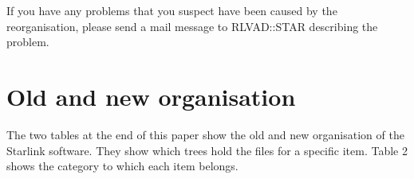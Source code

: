 If you have any problems that you suspect have been caused by the
reorganisation, please send a mail message to RLVAD::STAR describing the
problem.

\section{Old and new organisation}

The two tables at the end of this paper show the old and new organisation of
the Starlink software.
They show which trees hold the files for a specific item.
Table 2 shows the category to which each item belongs.

